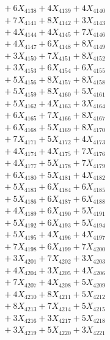 \documentclass[a4paper,10pt]{article}
\begin{document}
{\begin{align}
&\;  + 6 X_{4138} + 4 X_{4139} + 4 X_{4140} \\[0.3ex]
&\;  + 7 X_{4141} + 8 X_{4142} + 3 X_{4143} \\[0.3ex]
&\;  + 4 X_{4144} + 4 X_{4145} + 7 X_{4146} \\[0.3ex]
&\;  + 4 X_{4147} + 6 X_{4148} + 8 X_{4149} \\[0.5ex]\allowbreak
&\;  + 3 X_{4150} + 7 X_{4151} + 8 X_{4152} \\[0.3ex]
&\;  + 3 X_{4153} + 6 X_{4154} + 6 X_{4155} \\[0.3ex]
&\;  + 5 X_{4156} + 8 X_{4157} + 8 X_{4158} \\[0.3ex]
&\;  + 5 X_{4159} + 8 X_{4160} + 5 X_{4161} \\[0.3ex]
&\;  + 5 X_{4162} + 4 X_{4163} + 3 X_{4164} \\[0.3ex]
&\;  + 6 X_{4165} + 7 X_{4166} + 8 X_{4167} \\[0.3ex]
&\;  + 6 X_{4168} + 5 X_{4169} + 8 X_{4170} \\[0.3ex]
&\;  + 7 X_{4171} + 5 X_{4172} + 4 X_{4173} \\[0.3ex]
&\;  + 4 X_{4174} + 4 X_{4175} + 7 X_{4176} \\[0.3ex]
&\;  + 4 X_{4177} + 5 X_{4178} + 7 X_{4179} \\[0.5ex]\allowbreak
&\;  + 6 X_{4180} + 5 X_{4181} + 4 X_{4182} \\[0.3ex]
&\;  + 5 X_{4183} + 6 X_{4184} + 6 X_{4185} \\[0.3ex]
&\;  + 5 X_{4186} + 6 X_{4187} + 6 X_{4188} \\[0.3ex]
&\;  + 4 X_{4189} + 6 X_{4190} + 5 X_{4191} \\[0.3ex]
&\;  + 5 X_{4192} + 6 X_{4193} + 5 X_{4194} \\[0.3ex]
&\;  + 5 X_{4195} + 4 X_{4196} + 4 X_{4197} \\[0.3ex]
&\;  + 7 X_{4198} + 6 X_{4199} + 7 X_{4200} \\[0.3ex]
&\;  + 3 X_{4201} + 7 X_{4202} + 3 X_{4203} \\[0.3ex]
&\;  + 4 X_{4204} + 3 X_{4205} + 4 X_{4206} \\[0.3ex]
&\;  + 7 X_{4207} + 4 X_{4208} + 5 X_{4209} \\[0.5ex]\allowbreak
&\;  + 4 X_{4210} + 8 X_{4211} + 5 X_{4212} \\[0.3ex]
&\;  + 8 X_{4213} + 7 X_{4214} + 5 X_{4215} \\[0.3ex]
&\;  + 3 X_{4216} + 3 X_{4217} + 5 X_{4218} \\[0.3ex]
&\;  + 3 X_{4219} + 5 X_{4220} + 3 X_{4221} \\[0.3ex]

\end{align}}
\end{document}
